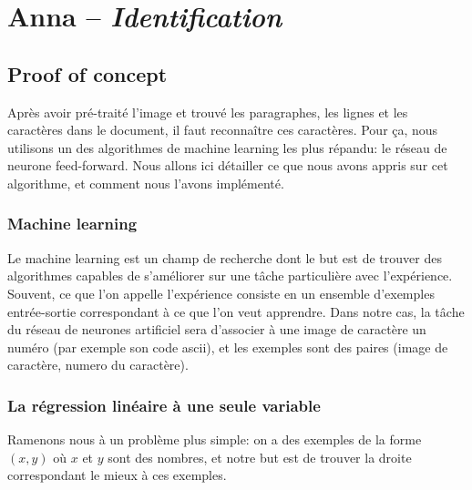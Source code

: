 \chapter{Anna -- \emph{Identification}}

\section{Proof of concept}
Après avoir pré-traité l'image et trouvé les paragraphes, les lignes et les caractères dans le document, il faut reconnaître ces caractères. Pour ça, nous utilisons un des algorithmes de machine learning les plus répandu: le réseau de neurone feed-forward. Nous allons ici détailler ce que nous avons appris sur cet algorithme, et comment nous l'avons implémenté.

\subsection{Machine learning}

Le machine learning est un champ de recherche dont le but est de trouver des algorithmes capables de s'améliorer sur une tâche particulière avec l'expérience. Souvent, ce que l'on appelle l'expérience consiste en un ensemble d'exemples entrée-sortie correspondant à ce que l'on veut apprendre. Dans notre cas, la tâche du réseau de neurones artificiel sera d'associer à une image de caractère un numéro (par exemple son code ascii), et les exemples sont des paires (image de caractère, numero du caractère).

\subsection{La régression linéaire à une seule variable}

Ramenons nous à un problème plus simple: on a des exemples de la forme $(x, y)$ où $x$ et $y$ sont des nombres, et notre but est de trouver la droite correspondant le mieux à ces exemples.\\

